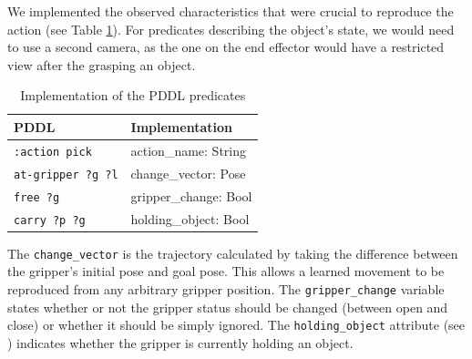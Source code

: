 %
%

We implemented the observed characteristics that were crucial to reproduce the action (see Table \ref{tab:PDDL implementation}).
For predicates describing the object's state, we would need to use a second camera, as the one on the end effector would have a restricted view after the grasping an object.

\begin{table}[h]
	\begin{center}
		\begin{tabular}{l|l}
			PDDL & Implementation\\ \hline
			\texttt{:action pick} & action\_name: String\\
			\texttt{at-gripper ?g ?l} & change\_vector: Pose\\
			\texttt{free ?g } & gripper\_change: Bool\\
			\texttt{carry ?p ?g} & holding\_object: Bool
		\end{tabular}
		\label{tab:PDDL implementation}
		\caption{Implementation of the PDDL predicates}
	\end{center}
\end{table}

The \texttt{change\_vector} is the trajectory calculated by taking the difference between the gripper's initial pose and goal pose.
This allows a learned movement to be reproduced from any arbitrary gripper position.
The \texttt{gripper\_change} variable states whether or not the gripper status should be changed (between open and close) or whether it should be simply ignored.
The \texttt{holding\_object} attribute (see ) indicates whether the gripper is currently holding an object.

